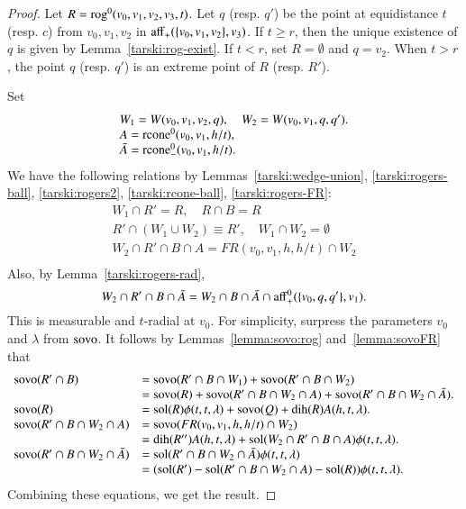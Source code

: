 \begin{proof}  Let $R = {\operatorname{rog}}^0(v_0,v_1,v_2,v_3,t)$.   Let
$q$ (resp. $q'$) be the point at equidistance $t$ 
(resp. $c$) from $v_0,v_1,v_2$ in
${\operatorname{aff}}_+(\{v_0,v_1,v_2\},v_3)$.
If $t\ge r$, then the unique existence of $q$ is given by
Lemma~\ref{tarski:rog-exist}.  If $t< r$, set $R=\emptyset$ and
$q=v_2$.
When $t>r$, the point $q$ (resp. $q'$) is an extreme point of $R$ (resp. $R'$).

Set
  $$
  \begin{array}{lll}
  W_1 = W(v_0,v_1,v_2,q), \quad W_2 = W(v_0,v_1,q,q').\\
  A = {\operatorname{rcone}}^0(v_0,v_1,h/t),\\
  \bar A = {\operatorname{rcone}}^0_-(v_0,v_1,h/t).\\
  \end{array}
  $$
We have the following relations by Lemmas~\ref{tarski:wedge-union},
\ref{tarski:rogers-ball}, \ref{tarski:rogers2}, \ref{tarski:rcone-ball}, \ref{tarski:rogers-FR}:
  $$
  \begin{array}{lll}
  W_1 \cap R' = R,\quad R\cap B = R\\
  R' \cap (W_1\cup W_2) \equiv R',\quad
  W_1\cap W_2 = \emptyset\\
  W_2\cap R'\cap B\cap A = FR(v_0,v_1,h,h/t)\cap W_2\\
  \end{array}
  $$
Also, by Lemma~\ref{tarski:rogers-rad},
  $$W_2\cap R'\cap B\cap\bar A = W_2\cap B\cap \bar A \cap
   {\operatorname{aff}}_+^0(\{v_0,q,q'\},v_1).$$ 
This is measurable and $t$-radial
at $v_0$.
For simplicity, surpress the parameters $v_0$ and $\lambda$ from
${\operatorname{sovo}}$.  It follows by Lemmas~\ref{lemma:sovo:rog} 
and~\ref{lemma:sovoFR} that
  $$
  \begin{array}{lll}
  {\operatorname{sovo}}(R'\cap B) &= {\operatorname{sovo}}(R'\cap B\cap W_1) + 
  {\operatorname{sovo}}(R'\cap B\cap W_2)\\
  &= {\operatorname{sovo}}(R)+ {\operatorname{sovo}}(R'\cap B\cap W_2\cap A) +
  {\operatorname{sovo}}(R'\cap B\cap W_2\cap \bar A).\\
  {\operatorname{sovo}}(R) &=\operatorname{sol}(R)\phi(t,t,\lambda) + {\operatorname{sovo}}(Q) +
     \operatorname{dih}(R) A(h,t,\lambda).\\
  {\operatorname{sovo}}(R'\cap B\cap W_2\cap A) &= {\operatorname{sovo}}(FR(v_0,v_1,h,h/t)\cap W_2)\\
   &= \operatorname{dih}(R'') A(h,t,\lambda) + \operatorname{sol}(W_2\cap R'\cap B\cap A)\phi(t,t,\lambda).\\
   {\operatorname{sovo}}(R'\cap B\cap W_2\cap \bar A) &= 
        \operatorname{sol}(R'\cap B\cap W_2\cap \bar A) \phi(t,t,\lambda)\\
   &= (\operatorname{sol}(R')-\operatorname{sol}(R'\cap B\cap W_2\cap A) -\operatorname{sol}(R))\phi(t,t,\lambda).
  \end{array}
  $$
Combining these equations, we get the result.
\end{proof}

